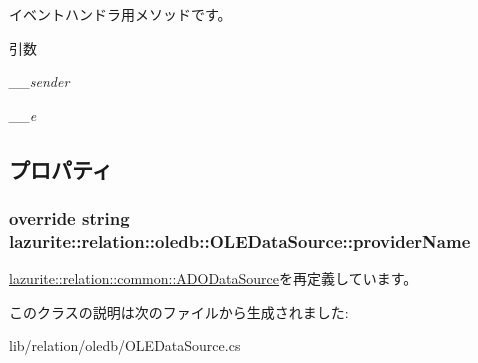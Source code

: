 イベントハンドラ用メソッドです。 
\begin{DoxyParams}{引数}
\item[{\em \_\-\_\-sender}]\item[{\em \_\-\_\-e}]\end{DoxyParams}


\subsection{プロパティ}
\hypertarget{classlazurite_1_1relation_1_1oledb_1_1_o_l_e_data_source_a69a5bde74764439a3b30a1e7787339ce}{
\subsubsection[{providerName}]{\setlength{\rightskip}{0pt plus 5cm}override string lazurite::relation::oledb::OLEDataSource::providerName}}
\label{classlazurite_1_1relation_1_1oledb_1_1_o_l_e_data_source_a69a5bde74764439a3b30a1e7787339ce}


\hyperlink{classlazurite_1_1relation_1_1common_1_1_a_d_o_data_source_ad238c170cf658cfdc3a1cf1843aeb956}{lazurite::relation::common::ADODataSource}を再定義しています。

このクラスの説明は次のファイルから生成されました:\begin{DoxyCompactItemize}
\item 
lib/relation/oledb/OLEDataSource.cs\end{DoxyCompactItemize}
